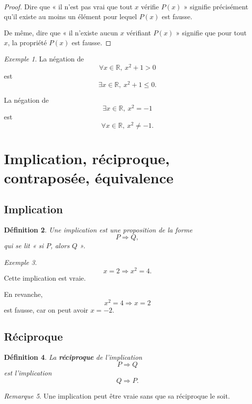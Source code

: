 \documentclass[11pt,a4paper]{article}
\newtheorem{definition}{Définition}[section]
\theoremstyle{remark}
\newtheorem{remarque}[definition]{Remarque}
\newtheorem{exemple}[definition]{Exemple}
\newcommand{\R}{\mathbb{R}}
\begin{document}
\begin{proof}
Dire que « il n’est pas vrai que tout \(x\) vérifie \(P(x)\) » signifie précisément qu’il existe au moins un élément pour lequel \(P(x)\) est fausse.

De même, dire que « il n’existe aucun \(x\) vérifiant \(P(x)\) » signifie que pour tout \(x\), la propriété \(P(x)\) est fausse.
\end{proof}

\begin{exemple}
La négation de
\[
\forall x\in\R,\ x^2+1>0
\]
est
\[
\exists x\in\R,\ x^2+1\leq 0.
\]

La négation de
\[
\exists x\in\R,\ x^2=-1
\]
est
\[
\forall x\in\R,\ x^2\neq -1.
\]
\end{exemple}

\section{Implication, réciproque, contraposée, équivalence}

\subsection{Implication}

\begin{definition}
Une implication est une proposition de la forme
\[
P \Longrightarrow Q,
\]
qui se lit « si \(P\), alors \(Q\) ».
\end{definition}

\begin{exemple}
\[
x=2 \Longrightarrow x^2=4.
\]
Cette implication est vraie.

En revanche,
\[
x^2=4 \Longrightarrow x=2
\]
est fausse, car on peut avoir \(x=-2\).
\end{exemple}

\subsection{Réciproque}

\begin{definition}
La \textbf{réciproque} de l’implication
\[
P\Longrightarrow Q
\]
est l’implication
\[
Q\Longrightarrow P.
\]
\end{definition}

\begin{remarque}
Une implication peut être vraie sans que sa réciproque le soit.
\end{remarque}
\end{document}
